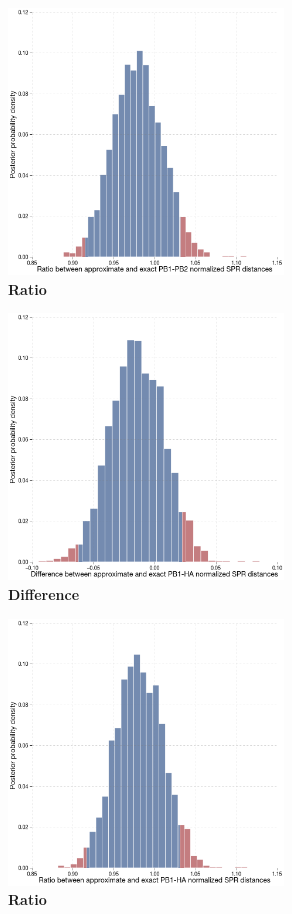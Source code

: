 \documentclass[11pt,oneside,letterpaper]{article}
\begin{document}
\begin{figure}
\centering  
\includegraphics[width=0.65\textwidth]  {supp_figures/InfB_supp_PB1-PB2_hist2.png}
\caption{\textbf{Ratio}}
\label{}
\end{figure}

\begin{figure}
\centering  
\includegraphics[width=0.65\textwidth]  {supp_figures/InfB_supp_PB1-HA_hist.png}
\caption{\textbf{Difference}}
\label{}
\end{figure}

\begin{figure}
\centering  
\includegraphics[width=0.65\textwidth]  {supp_figures/InfB_supp_PB1-HA_hist2.png}
\caption{\textbf{Ratio}}
\label{}
\end{figure}
\end{document}
